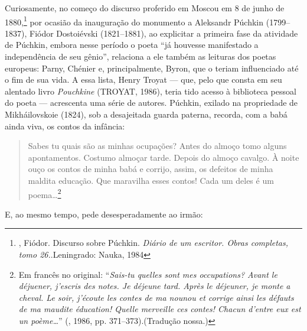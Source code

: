 Curiosamente, no começo do discurso proferido em Moscou em 8 de junho de
1880,\footnote{, Fiódor. Discurso sobre Púchkin. \emph{Diário de um escritor. Obras completas, tomo 26.}.Leningrado: Nauka, 1984} por ocasião da inauguração do monumento a Aleksandr Púchkin
(1799--1837), Fiódor Dostoiévski (1821--1881), ao explicitar a primeira fase da atividade de Púchkin, embora nesse período o poeta ``já houvesse manifestado a independência de seu gênio'', relaciona a
ele também as
leituras dos poetas europeus: Parny, Chénier e, principalmente, Byron,
que o teriam influenciado até o fim de sua vida. A essa lista, Henry
Troyat --- que, pelo que consta em seu alentado livro \emph{Pouchkine} (TROYAT, 1986),
teria tido acesso à biblioteca pessoal do poeta --- acrescenta uma série
de autores. Púchkin, exilado na propriedade de Mikháilovskoie (1824), sob a
desajeitada guarda paterna, recorda, com a babá
ainda viva, os contos da infância:

\begin{quote}
Sabes tu quais são as minhas ocupações? Antes do almoço tomo alguns apontamentos. Costumo almoçar tarde. Depois do almoço cavalgo. À noite ouço os contos de minha babá e corrijo, assim, os defeitos de minha maldita educação. Que maravilha esses contos! Cada um deles é um poema\ldots{}\footnote{Em francês no original: ``\emph{Sais-tu quelles sont mes occupations? Avant le déjuener, j'escris des notes. Je déjeune tard. Après le déjeuner, je monte a cheval. Le soir, j'écoute les contes de ma nounou et corrige ainsi les défauts de ma maudite éducation! Quelle merveille ces contes! Chacun d'entre eux est un poème\ldots{}}'' (, 1986, pp. 371--373).(Tradução nossa.)}
\end{quote}


E, ao mesmo tempo, pede desesperadamente ao irmão:

